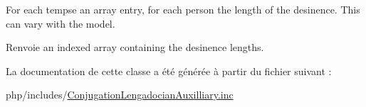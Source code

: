 For each tempse an array entry, for each person the length of the desinence. This can vary with the model. 

\begin{DoxyReturn}{Renvoie}
an indexed array containing the desinence lengths. 
\end{DoxyReturn}


La documentation de cette classe a été générée à partir du fichier suivant \+:\begin{DoxyCompactItemize}
\item 
php/includes/\hyperlink{_conjugation_lengadocian_auxilliary_8inc}{Conjugation\+Lengadocian\+Auxilliary.\+inc}\end{DoxyCompactItemize}
